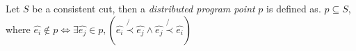 


\begin{definition}
    \label{def:distributed_program_point} Let $S$ be a consistent cut,
    then a \textit{distributed program point} $p$ is defined as.  $p
    \subseteq S$, where $\hat{e_i} \notin p \iff \exists \hat{e_j} \in
    p, (\hat{e_i} \not{\prec} \hat{e_j} \wedge \hat{e_j} \not{\prec}
    \hat{e_i})$ \end{definition}

